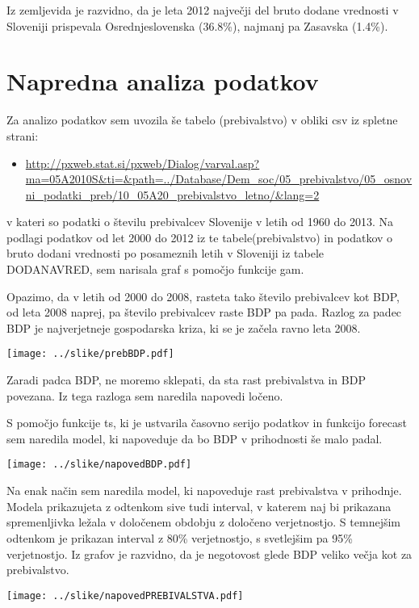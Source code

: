 \documentclass[a4paper, 11pt]{article}
\begin{document}
Iz zemljevida je razvidno, da je leta 2012 največji del bruto dodane vrednosti v Sloveniji prispevala Osrednjeslovenska (36.8\%), najmanj pa Zasavska (1.4\%).


\section{Napredna analiza podatkov}

Za analizo podatkov sem uvozila še tabelo (prebivalstvo) v obliki csv iz spletne strani:
\begin{itemize}
\item{\url{http://pxweb.stat.si/pxweb/Dialog/varval.asp?ma=05A2010S&ti=&path=../Database/Dem_soc/05_prebivalstvo/05_osnovni_podatki_preb/10_05A20_prebivalstvo_letno/&lang=2}}
\end{itemize}
v kateri so podatki o številu prebivalcev Slovenije v letih od 1960 do 2013.
Na podlagi podatkov od let 2000 do 2012 iz te tabele(prebivalstvo) in podatkov o bruto dodani vrednosti po posameznih letih v Sloveniji iz tabele DODANAVRED, sem narisala graf s pomočjo funkcije gam. 

Opazimo, da v letih od 2000 do 2008, rasteta tako število prebivalcev kot BDP, od leta 2008 naprej, pa število prebivalcev raste BDP pa pada. Razlog za padec BDP je najverjetneje gospodarska kriza, ki se je začela ravno leta 2008.

\texttt{[image: ../slike/prebBDP.pdf]}

Zaradi padca BDP, ne moremo sklepati, da sta rast prebivalstva in BDP povezana. Iz tega razloga sem naredila napovedi ločeno.

S pomočjo funkcije ts, ki je ustvarila časovno serijo podatkov in funkcijo forecast sem naredila model, ki napoveduje da bo BDP v prihodnosti še malo padal.

\newpage
\begin{center}
\texttt{[image: ../slike/napovedBDP.pdf]}
\end{center}
Na enak način sem naredila model, ki napoveduje
rast prebivalstva v prihodnje. \\
Modela prikazujeta z odtenkom sive tudi interval, v katerem naj bi prikazana spremenljivka ležala v določenem obdobju z določeno verjetnostjo. S temnejšim odtenkom je prikazan interval z 80\% verjetnostjo, s svetlejšim pa 95\% verjetnostjo. Iz grafov je razvidno, da je negotovost glede BDP veliko večja kot za prebivalstvo.

\newpage
\begin{center}
\texttt{[image: ../slike/napovedPREBIVALSTVA.pdf]}
\end{center} 
\end{document}
